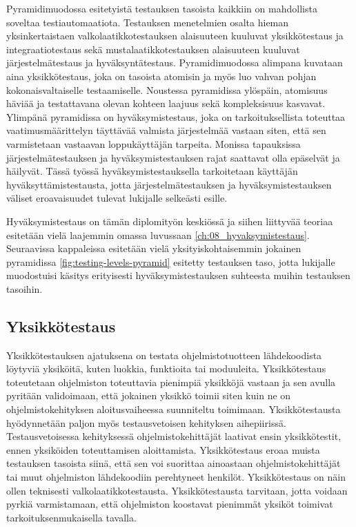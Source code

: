   Pyramidimuodossa esitetyistä testauksen tasoista kaikkiin on mahdollista soveltaa testiautomaatiota.
  Testauksen menetelmien osalta hieman yksinkertaistaen valkolaatikkotestauksen alaisuuteen kuuluvat yksikkötestaus ja integraatiotestaus sekä mustalaatikkotestauksen alaisuuteen kuuluvat järjestelmätestaus ja hyväksyntätestaus.
  Pyramidimuodossa alimpana kuvataan aina yksikkötestaus, joka on tasoista atomisin ja myös luo vahvan pohjan kokonaisvaltaiselle testaamiselle.
  Noustessa pyramidissa ylöspäin, atomisuus häviää ja testattavana olevan kohteen laajuus sekä kompleksisuus kasvavat.
  Ylimpänä pyramidissa on hyväksymistestaus, joka on tarkoituksellista toteuttaa vaatimusmäärittelyn täyttävää valmista järjestelmää vastaan siten, että sen varmistetaan vastaavan loppukäyttäjän tarpeita.
  Monissa tapauksissa järjestelmätestauksen ja hyväksymistestauksen rajat saattavat olla epäselvät ja häilyvät.
  Tässä työssä hyväksymistestauksella tarkoitetaan käyttäjän hyväksyttämistestausta, jotta järjestelmätestauksen ja hyväksymistestauksen väliset eroavaisuudet tulevat lukijalle selkeästi esille.

  Hyväksymistestaus on tämän diplomityön keskiössä ja siihen liittyvää teoriaa esitetään vielä laajemmin omassa luvussaan \ref{ch:08_hyvaksymistestaus}.
  Seuraavissa kappaleissa esitetään vielä yksityiskohtaisemmin jokainen pyramidissa \ref{fig:testing-levels-pyramid} esitetty testauksen taso, jotta lukijalle muodostuisi käsitys erityisesti hyväksymistestauksen suhteesta muihin testauksen tasoihin.

  \subsection{Yksikkötestaus} \label{ch:07_yksikkotestaus}

    Yksikkötestauksen ajatuksena on testata ohjelmistotuotteen lähdekoodista löytyviä yksiköitä, kuten luokkia, funktioita tai moduuleita.
    Yksikkötestaus toteutetaan ohjelmiston toteuttavia pienimpiä yksikköjä vastaan ja sen avulla pyritään validoimaan, että jokainen yksikkö toimii siten kuin ne on ohjelmistokehityksen aloitusvaiheessa suunniteltu toimimaan.
    Yksikkötestausta hyödynnetään paljon myös testausvetoisen kehityksen aihepiirissä.
    Testausvetoisessa kehityksessä ohjelmistokehittäjät laativat ensin yksikkötestit, ennen yksiköiden toteuttamisen aloittamista.
    Yksikkötestaus eroaa muista testauksen tasoista siinä, että sen voi suorittaa ainoastaan ohjelmistokehittäjät tai muut ohjelmiston lähdekoodiin perehtyneet henkilöt.
    Yksikkötestaus on näin ollen teknisesti valkolaatikkotestausta.
    Yksikkötestausta tarvitaan, jotta voidaan pyrkiä varmistamaan, että ohjelmiston koostavat pienimmät yksiköt toimivat tarkoituksenmukaisella tavalla.


